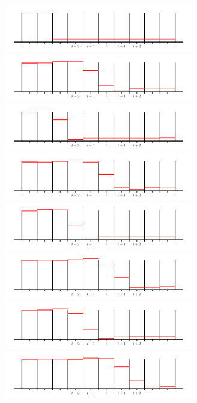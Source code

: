 \begin{figure}[p!]
\centering
\includegraphics[width=3.25in]{rea-nolimit-start_001}\hspace{1em}
\includegraphics[width=3.25in]{rea-nolimit-start_005} \\
\includegraphics[width=3.25in]{rea-nolimit-start_002}\hspace{1em}
\includegraphics[width=3.25in]{rea-nolimit-start_006} \\
\includegraphics[width=3.25in]{rea-nolimit-start_003}\hspace{1em}
\includegraphics[width=3.25in]{rea-nolimit-start_007} \\
\includegraphics[width=3.25in]{rea-nolimit-start_004}\hspace{1em}
\includegraphics[width=3.25in]{rea-nolimit-start_008} \\

\end{figure}
